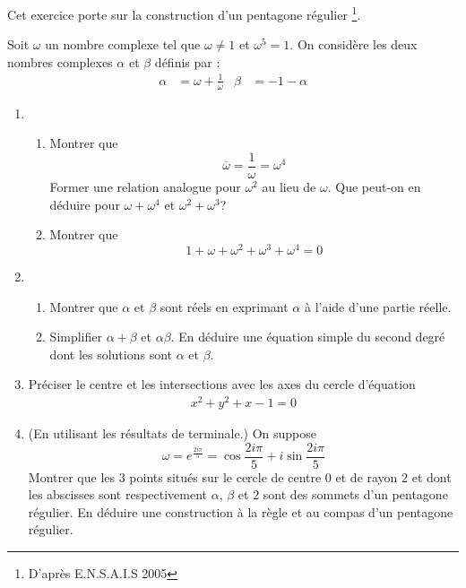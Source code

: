 Cet exercice porte sur la construction d'un pentagone régulier \footnote{D'après E.N.S.A.I.S 2005}.

Soit $\omega$ un nombre complexe tel que $\omega \neq 1$ et $\omega^5 = 1$. On considère les deux nombres complexes $\alpha$ et $\beta$ définis par :
\begin{align*}
 \alpha &= \omega + \frac{1}{\omega}  &   \beta &= -1 -\alpha 
\end{align*}
\begin{enumerate}
 \item 
 \begin{enumerate}
  \item Montrer que 
\begin{displaymath}
 \overline{\omega} = \frac{1}{\omega} = \omega^4
\end{displaymath}
Former une relation analogue pour $\omega^2$ au lieu de $\omega$. Que peut-on en déduire pour $\omega + \omega^4$ et $\omega^2 + \omega^3$?
  \item Montrer que 
  \begin{displaymath}
   1 + \omega + \omega^2 + \omega^3 + \omega^4 = 0
  \end{displaymath}
 \end{enumerate}

 \item 
 \begin{enumerate}
  \item Montrer que $\alpha$ et $\beta$ sont réels en exprimant $\alpha$ à l'aide d'une partie réelle.
  \item Simplifier $\alpha + \beta$ et $\alpha \beta$. En déduire une équation simple du second degré dont les solutions sont $\alpha$ et $\beta$.
 \end{enumerate}
  
\item Préciser le centre et les intersections avec les axes du cercle d'équation
\begin{align*}
 x^2 +y^2 +x -1 =0
\end{align*}

\item (En utilisant les résultats de terminale.) On suppose
\begin{displaymath}
 \omega = e^{\frac{2i\pi}{5}} = \cos \frac{2i\pi}{5} + i \sin \frac{2i\pi}{5}
\end{displaymath}
Montrer que les 3 points situés sur le cercle de centre 0 et de rayon 2 et dont les abscisses sont respectivement $\alpha$, $\beta$ et $2$  sont des sommets d'un pentagone régulier. En déduire une construction à la règle et au compas d'un pentagone régulier.
\end{enumerate}
